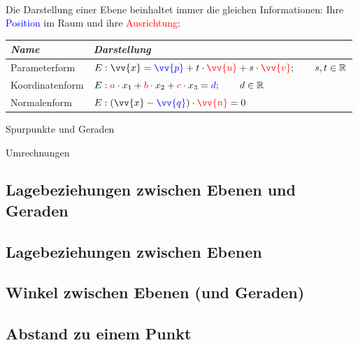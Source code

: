         \paragraph{} Die Darstellung einer Ebene beinhaltet immer die gleichen Informationen: Ihre \textcolor{blue}{Position} im Raum und ihre
        \textcolor{red}{Ausrichtung}:\\
        \begin{center}
            \begin{tabular}{@{} *2l @{}}
                \emph{Name} & \emph{Darstellung}   \\\midrule
                Parameterform \qquad \qquad \qquad \qquad \qquad & $E:\vv{x}=\textcolor{blue}{\vv{p}} + t\cdot \textcolor{red}{\vv{u}} + s\cdot \textcolor{red}{\vv{v}} ; \qquad s,t \in \R $    \\
                Koordinatenform \qquad \qquad \qquad \qquad \qquad & $E: \textcolor{red}{a} \cdot x_{1} + \textcolor{red}{b} \cdot x_{2} + \textcolor{red}{c} \cdot x_{3} = \textcolor{blue}{d} ; \qquad d \in \mathbb{R} $ \\
                Normalenform \qquad \qquad \qquad \qquad \qquad & $E:(\vv{x} - \textcolor{blue}{\vv{q}}) \cdot \textcolor{red}{\vv{n}} = 0 $\\
            \end{tabular}
        \end{center}

    Spurpunkte und Geraden

    Umrechnungen

    \subsection{Lagebeziehungen zwischen Ebenen und Geraden}

    \subsection{Lagebeziehungen zwischen Ebenen}

    \subsection{Winkel zwischen Ebenen (und Geraden)}

    \subsection{Abstand zu einem Punkt}




